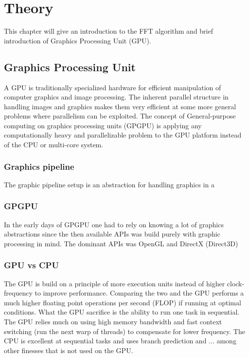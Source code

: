 \chapter{Theory}

This chapter will give an introduction to the FFT algorithm and brief introduction of Graphics Processing Unit (GPU).

\section{Graphics Processing Unit}

A GPU is traditionally specialized hardware for efficient manipulation of computer graphics and image processing. The inherent parallel structure in handling images and graphics makes them very efficient at some more general problems where parallelism can be exploited. The concept of General-purpose computing on graphics processing units (GPGPU) is applying any computationally heavy and parallelizable problem to the GPU platform instead of the CPU or multi-core system.

\subsection{Graphics pipeline}

The graphic pipeline setup is an abstraction for handling graphics in a 

\subsection{GPGPU}

In the early days of GPGPU one had to rely on knowing a lot of graphics abstractions since the then available APIs was build purely with graphic processing in mind. The dominant APIs was OpenGL and DirectX (Direct3D)

\subsection{GPU vs CPU}

The GPU is build on a principle of more execution units instead of higher clock-frequency to improve performance. Comparing the two and the GPU performs a much higher floating point operations per second (FLOP) if running at optimal conditions. What the GPU sacrifice is the ability to run one task in sequential. The GPU relies much on using high memory bandwidth and fast context switching (run the next warp of threads) to compensate for lower frequency. The CPU is excellent at sequential tasks and uses branch prediction and ... among other finesses that is not used on the GPU.

